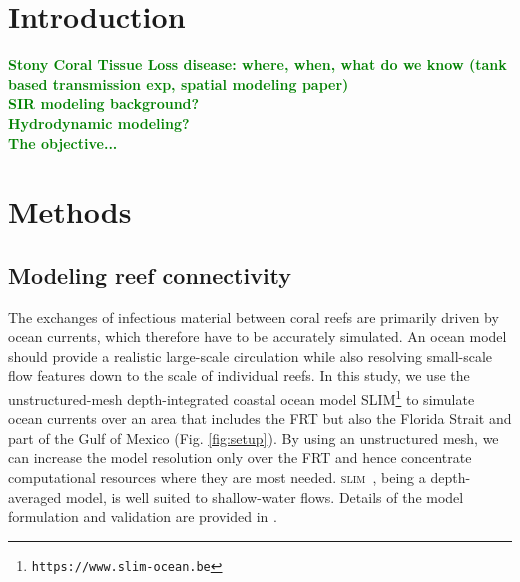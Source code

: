 \documentclass[utf8]{frontiersSCNS}
\newcommand{\slim}{\textsc{slim}\ }
\newcommand{\erinn}[1]{\textbf{\textcolor{green}{#1}}}
\begin{document}
\section{Introduction}
\erinn{Stony Coral Tissue Loss disease: where, when, what do we know (tank based transmission exp, spatial modeling paper) \\
SIR modeling background? \\
Hydrodynamic modeling? \\
The objective...}

\section{Methods}

\subsection{Modeling reef connectivity}
The exchanges of infectious material between coral reefs are primarily driven by ocean currents, which therefore have to be accurately simulated. An ocean model should provide a realistic large-scale circulation while also resolving small-scale flow features down to the scale of individual reefs. In this study, we use the unstructured-mesh depth-integrated coastal ocean model SLIM\footnote{{\tt https://www.slim-ocean.be}} to simulate ocean currents over an area that includes the FRT but also the Florida Strait and part of the Gulf of Mexico (Fig. \ref{fig:setup}). By using an unstructured mesh, we can increase the model resolution only over the FRT and hence concentrate computational resources where they are most needed. \slim, being a depth-averaged model, is well suited to shallow-water flows. %
Details of the model formulation and validation are provided in \cite{frys20}. 
\end{document}
